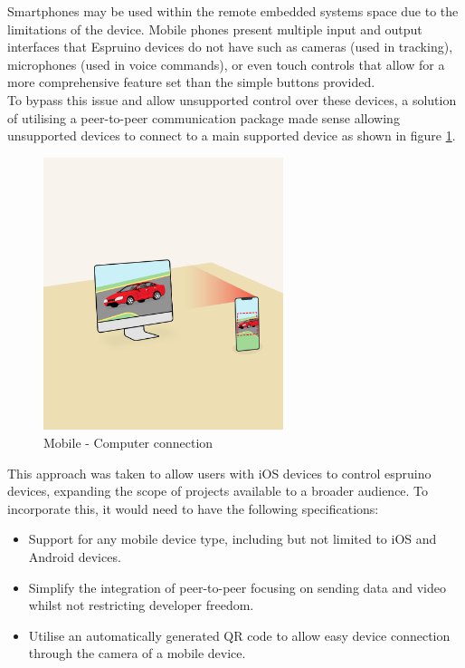 \documentclass{l4proj}
\begin{document}
Smartphones may be used within the remote embedded systems space due to the limitations of the device. Mobile phones present multiple input and output interfaces that Espruino devices do not have such as cameras (used in tracking), microphones (used in voice commands), or even touch controls that allow for a more comprehensive feature set than the simple buttons provided.
\\ 

To bypass this issue and allow unsupported control over these devices, a solution of utilising a peer-to-peer communication package made sense allowing unsupported devices to connect to a main supported device as shown in figure \ref{fig:mobile-computer-connection}. 

\begin{figure}[!ht]
    \centering
    \includegraphics[width=7cm]{dissertation/images/mobile-computer-connection.png}
    \caption{Mobile - Computer connection}
    \label{fig:mobile-computer-connection}
\end{figure}

This approach was taken to allow users with iOS devices to control espruino devices, expanding the scope of projects available to a broader audience. To incorporate this, it would need to have the following specifications:
\\
\begin{itemize}
    \item Support for any mobile device type, including but not limited to iOS and Android devices.
    \item Simplify the integration of peer-to-peer focusing on sending data and video whilst not restricting developer freedom.
    \item Utilise an automatically generated QR code to allow easy device connection through the camera of a mobile device.
\end{itemize}
\end{document}
